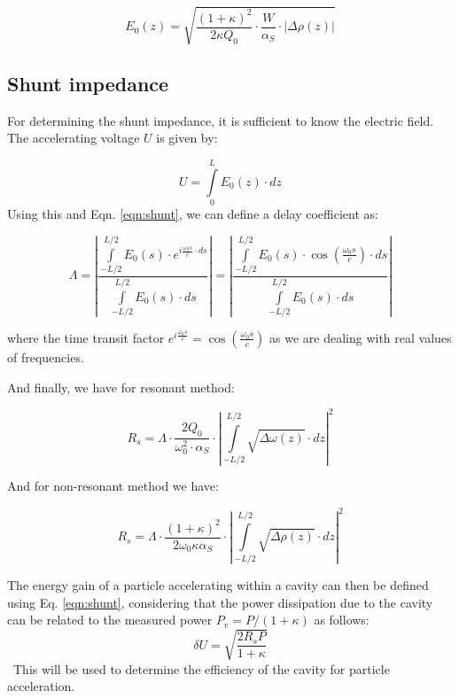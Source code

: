 \documentclass[a4paper]{report}
\numberwithin{equation}{section}
\begin{document}
\begin{equation} \label{eqn:E0_nonres}
		E_{0}(z) = \sqrt{\frac{(1 + \kappa)^2}{2 \kappa Q_{0}}\cdot \frac{W}{\alpha_{S}}\cdot \left| \Delta \rho(z) \right| }
\end{equation}

\subsection{Shunt impedance}
For determining the shunt impedance, it is sufficient to know the electric field. The accelerating voltage $U$ is given by: 

\[ 
		U = \int\limits_{0}^{L} E_{0}(z) \cdot dz
\]
Using this and Eqn. \ref{eqn:shunt}, we can define a delay coefficient as: 

\begin{equation}
		\Lambda = \left| \frac{\int\limits_{-L/2}^{L/2} E_{0}(s) \cdot e^{i \frac{\omega_{0}s}{c}\cdot ds}}{\int\limits_{-L/2}^{L/2} E_{0}(s) \cdot ds} \right| = 
		\left| \frac{\int\limits_{-L/2}^{L/2} E_{0}(s) \cdot \cos\left(\frac{\omega_{0}s}{c} \right)\cdot ds }{\int\limits_{-L/2}^{L/2} E_{0}(s) \cdot ds} \right| 
\end{equation}

where the time transit factor $e^{i \frac{\omega_{0}s}{c}} = \cos\left(\frac{\omega_{0}s}{c}\right)$ as we are dealing with real values of frequencies. \par 
And finally, we have for resonant method:

\begin{equation} \label{eqn:Rs_res}
		R_{s} = \Lambda \cdot \frac{2Q_{0}}{\omega_{0}^2 \cdot \alpha_{S}} \cdot \left| \int\limits_{-L/2}^{L/2} \sqrt{\Delta \omega (z)} \cdot dz \right|^2
\end{equation}

And for non-resonant method we have: 

\begin{equation} \label{eqn:Rs_nonres}
		R_{s} = \Lambda \cdot \frac{(1 + \kappa)^2}{2 \omega_{0} \kappa \alpha_{S}} \cdot \left| \int\limits_{-L/2}^{L/2} \sqrt{\Delta \rho (z)} \cdot dz \right|^2
\end{equation}

The energy gain of a particle accelerating within a cavity can then be defined using Eq. \ref{eqn:shunt}, considering that the power dissipation due to the cavity 
can be related to the measured power $P_v = P / (1 + \kappa)$ as follows:
\begin{equation} \label{eqn:energy_gain}
	\delta U = \sqrt{\frac{2 R_s P}{1 + \kappa}}
\end{equation}\
This will be used to determine the efficiency of the cavity for particle acceleration.
\end{document}
